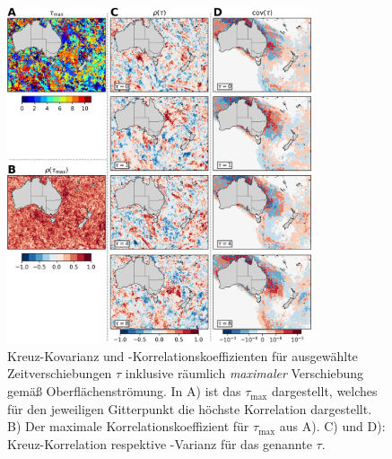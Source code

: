 \documentclass[12pt,a4paper,onecolumn,headheight=30pt]{scrartcl}
\begin{document}
\begin{figure}[htbp]
\centering
\includegraphics[width=0.8\textwidth]{bilder/correlation_selection.png}
\caption{Kreuz-Kovarianz und -Korrelationskoeffizienten für ausgewählte Zeitverschiebungen $\tau$ inklusive räumlich \textit{maximaler} Verschiebung gemäß Oberflächenströmung. In A) ist das $\tau_\text{max}$ dargestellt, welches für den jeweiligen Gitterpunkt die höchste Korrelation dargestellt. B) Der maximale Korrelationskoeffizient für $\tau_\text{max}$ aus A). C) und D): Kreuz-Korrelation respektive -Varianz für das genannte $\tau$.} \label{fig:correlation_selection}
\end{figure}
\end{document}
